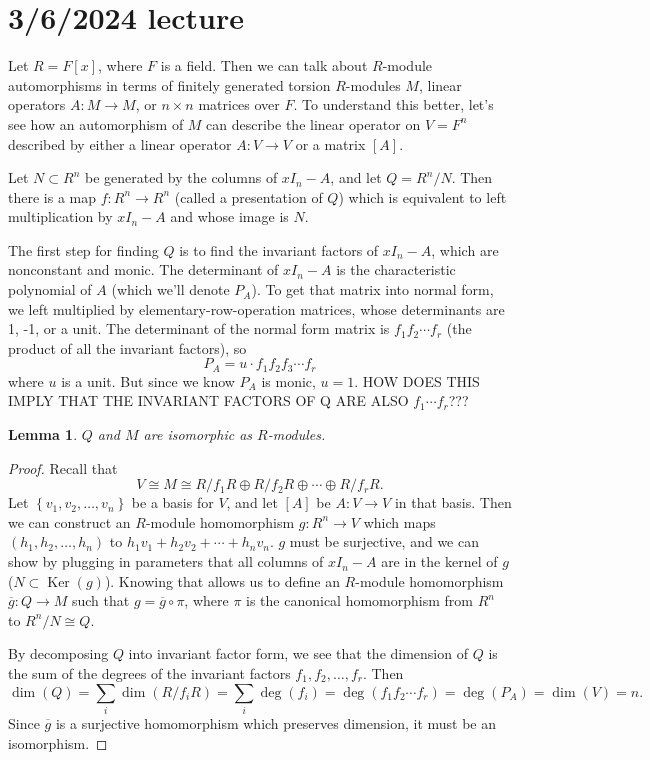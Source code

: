 \documentclass[12pt]{article}
\newtheorem{lem}[thm]{Lemma}
\begin{document}
\section{3/6/2024 lecture}
Let $R=F[x]$, where $F$ is a field. Then we can talk about $R$-module automorphisms in terms of finitely generated torsion $R$-modules $M$, linear operators $A: M \rightarrow M$, or $n \times n$ matrices over $F$. To understand this better, let's see how an automorphism of $M$ can describe the linear operator on $V = F^n$ described by either a linear operator $A: V \rightarrow V$ or a matrix $[A]$.
\par
Let $N \subset R^n$ be generated by the columns of $x I_n -A$, and let $Q=R^n/N$. Then there is a map $f: R^n \rightarrow R^n$ (called a presentation of $Q$) which is equivalent to left multiplication by $xI_n-A$ and whose image is $N$.
\par
The first step for finding $Q$ is to find the invariant factors of $xI_n-A$, which are nonconstant and monic. The determinant of $xI_n-A$ is the characteristic polynomial of $A$ (which we'll denote $P_A$). To get that matrix into normal form, we left multiplied by elementary-row-operation matrices, whose determinants are 1, -1, or a unit. The determinant of the normal form matrix is $f_1 f_2 \cdots f_r$ (the product of all the invariant factors), so
\[ P_A=u \cdot f_1f_2f_3\cdots f_r \]
where $u$ is a unit. But since we know $P_A$ is monic, $u=1$. HOW DOES THIS IMPLY THAT THE INVARIANT FACTORS OF Q ARE ALSO $f_1 \cdots f_r$???
\par
\begin{lem}\label{QisomorphictoM}
    $Q$ and $M$ are isomorphic as $R$-modules.
\end{lem}
\begin{proof}
    Recall that
    \[ V \cong M \cong R/f_1R \oplus R/f_2R \oplus \cdots \oplus R/f_rR. \]
    Let $ \left\{ v_1, v_2,\dots,v_n \right\}$ be a basis for $V$, and let $[A]$ be $A: V\rightarrow V$ in that basis. Then we can construct an $R$-module homomorphism $g: R^n \rightarrow V$ which maps $(h_1, h_2, \dots, h_n)$ to $h_1v_1 + h_2v_2 + \cdots + h_nv_n$. $g$ must be surjective, and we can show by plugging in parameters that all columns of $xI_n-A$ are in the kernel of $g$ ($N \subset \operatorname{Ker}(g)$). Knowing that allows us to define an $R$-module homomorphism $\overline{g}: Q \rightarrow M$ such that $g = \overline{g} \circ \pi$, where $\pi$ is the canonical homomorphism from $R^n$ to $R^n/N \cong Q$.
    \par
    By decomposing $Q$ into invariant factor form, we see that the dimension of $Q$ is the sum of the degrees of the invariant factors $f_1, f_2, \dots, f_r$. Then
    \[ \operatorname{dim}(Q) = \sum_i \operatorname{dim}(R/f_iR) = \sum_i \operatorname{deg}(f_i) = \operatorname{deg}(f_1f_2\cdots f_r) = \operatorname{deg}(P_A) = \operatorname{dim}(V) = n. \]
    Since $\overline{g}$ is a surjective homomorphism which preserves dimension, it must be an isomorphism.
\end{proof}
\end{document}

